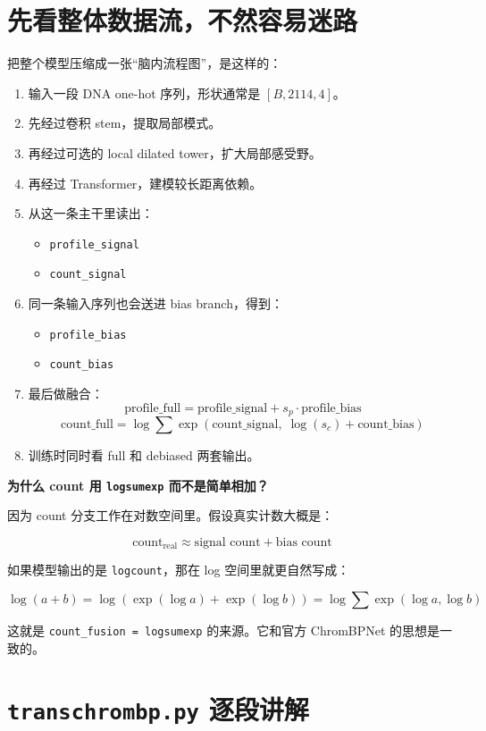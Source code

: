 \documentclass[11pt,a4paper]{ctexart}
\begin{document}
\section{先看整体数据流，不然容易迷路}

把整个模型压缩成一张“脑内流程图”，是这样的：

\begin{enumerate}[leftmargin=2em]
\item 输入一段 DNA one-hot 序列，形状通常是 $[B, 2114, 4]$。
\item 先经过卷积 stem，提取局部模式。
\item 再经过可选的 local dilated tower，扩大局部感受野。
\item 再经过 Transformer，建模较长距离依赖。
\item 从这一条主干里读出：
  \begin{itemize}
  \item \texttt{profile\_signal}
  \item \texttt{count\_signal}
  \end{itemize}
\item 同一条输入序列也会送进 bias branch，得到：
  \begin{itemize}
  \item \texttt{profile\_bias}
  \item \texttt{count\_bias}
  \end{itemize}
\item 最后做融合：
\[
\text{profile\_full}=\text{profile\_signal}+s_p\cdot \text{profile\_bias}
\]
\[
\text{count\_full}=\log\sum\exp\left(\text{count\_signal},\;\log(s_c)+\text{count\_bias}\right)
\]
\item 训练时同时看 full 和 debiased 两套输出。
\end{enumerate}

\textbf{为什么 count 用 \texttt{logsumexp} 而不是简单相加？}

因为 count 分支工作在对数空间里。假设真实计数大概是：

\[
\text{count}_{\text{real}} \approx \text{signal count} + \text{bias count}
\]

如果模型输出的是 \texttt{logcount}，那在 log 空间里就更自然写成：

\[
\log(a+b)=\log\left(\exp(\log a)+\exp(\log b)\right)=\log\sum\exp(\log a,\log b)
\]

这就是 \texttt{count\_fusion = logsumexp} 的来源。它和官方 ChromBPNet 的思想是一致的。

\section{\texttt{transchrombp.py} 逐段讲解}
\end{document}
